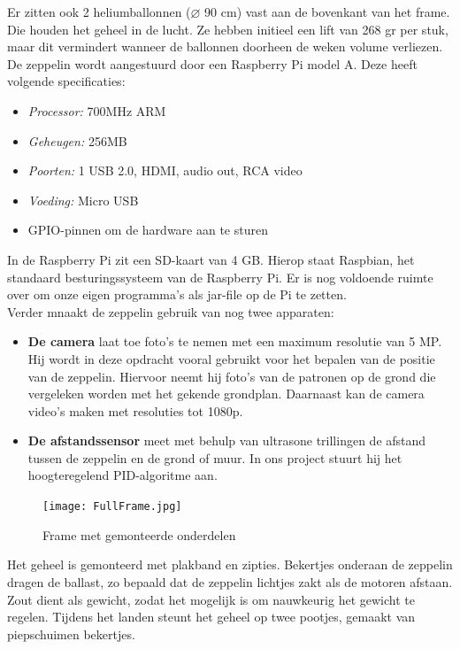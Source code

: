 \documentclass[eind]{penoverslag}
\begin{document}
Er zitten ook 2 heliumballonnen ($\diameter$ 90 cm) vast aan de bovenkant van het frame. Die houden het geheel in de lucht. Ze hebben initieel een lift van 268 gr per stuk, maar dit vermindert wanneer de ballonnen doorheen de weken volume verliezen. \\

De zeppelin wordt aangestuurd door een Raspberry Pi model A. Deze heeft volgende specificaties:
\begin{itemize}
\item \emph{Processor:} 700MHz ARM
\item \emph{Geheugen:} 256MB
\item \emph{Poorten:} 1 USB 2.0, HDMI, audio out, RCA video
\item \emph{Voeding:} Micro USB
\item GPIO-pinnen om de hardware aan te sturen
\end{itemize}

In de Raspberry Pi zit een SD-kaart van 4 GB. Hierop staat Raspbian, het standaard besturingssysteem van de Raspberry Pi. Er is nog voldoende ruimte over om onze eigen programma's als jar-file op de Pi te zetten. \\

Verder mnaakt de zeppelin gebruik van nog twee apparaten:
\begin{itemize}
\item \textbf{De camera} laat toe foto's te nemen met een maximum resolutie van 5 MP. Hij wordt in deze opdracht vooral gebruikt voor het bepalen van de positie van de zeppelin. Hiervoor neemt hij foto's van de patronen op de grond die vergeleken worden met het gekende grondplan. Daarnaast kan de camera video's maken met resoluties tot 1080p.

\item \textbf{De afstandssensor} meet met behulp van ultrasone trillingen de afstand tussen de zeppelin en de grond of muur. In ons project stuurt hij het hoogteregelend PID-algoritme aan. 
\end{itemize}

\begin{figure}[ht!]
\centering
\texttt{[image: FullFrame.jpg]}
\caption{Frame met gemonteerde onderdelen}
\label{zeppFrame}
\end{figure}

Het geheel is gemonteerd met plakband en zipties. Bekertjes onderaan de zeppelin dragen de ballast, zo bepaald dat de zeppelin lichtjes zakt als de motoren afstaan. Zout dient als gewicht, zodat het mogelijk is om nauwkeurig het gewicht te regelen. Tijdens het landen steunt het geheel op twee pootjes, gemaakt van piepschuimen bekertjes. \\
\end{document}
